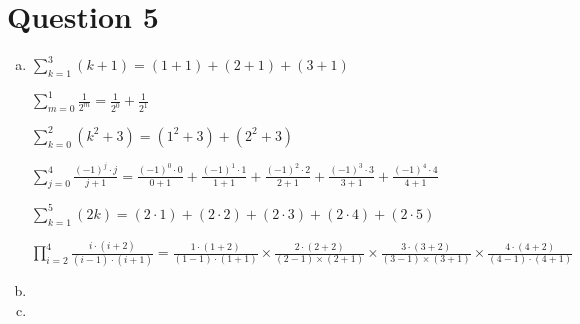 \documentclass[12pt]{article}
\begin{document}
\section*{Question 5}

\begin{enumerate}[a)]
    \item
        $\sum\limits_{k=1}^3 (k + 1) = (1 + 1) + (2 + 1) + (3 + 1)$

        $\sum\limits_{m=0}^1 \frac{1}{2^m} = \frac{1}{2^0} + \frac{1}{2^1}$

        $\sum\limits_{k=0}^2 (k^2 + 3) = (1^2 + 3) + (2^2 + 3)$

        $\sum\limits_{j=0}^4 \frac{(-1)^j \cdot j}{j + 1} = \frac{(-1)^0 \cdot 0}{0 + 1} + \frac{(-1)^1 \cdot 1}{1 + 1} + \frac{(-1)^2 \cdot 2}{2 + 1} + \frac{(-1)^3  \cdot 3}{3 + 1} + \frac{(-1)^4 \cdot 4}{4 + 1}$

        $\sum\limits_{k=1}^5 (2k) = (2 \cdot 1) + (2 \cdot 2) + (2 \cdot 3) + (2 \cdot 4) + (2 \cdot 5)$


        $\prod\limits_{i=2}^4 \frac{i \cdot (i + 2)}{(i - 1) \cdot (i + 1)} = \frac{1 \cdot (1 + 2)}{(1 - 1) \cdot (1 + 1)} \times \frac{2 \cdot (2 + 2)}{(2 - 1) \times (2 + 1)} \times \frac{3 \cdot (3 + 2)}{(3 - 1) \times (3 + 1)} \times \frac{4 \cdot (4 + 2)}{(4 - 1) \cdot (4 + 1)}$
    \bigskip

    \item

    \bigskip

    \item

\end{enumerate}
\end{document}
